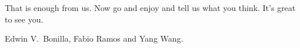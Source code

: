 {That is enough from us. Now go and enjoy \mlss  and tell us what you think. It's great to see you.






\bigskip

Edwin V.~Bonilla, Fabio Ramos and Yang Wang.


}
